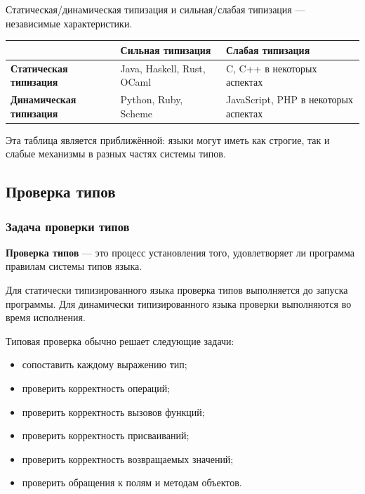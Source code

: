 \documentclass[12pt,a4paper]{article}
\begin{document}
Статическая/динамическая типизация и сильная/слабая типизация --- независимые
характеристики.

\begin{center}
\begin{tabular}{|p{}|p{}|p{}|}
\hline
 & \textbf{Сильная типизация} & \textbf{Слабая типизация} \\
\hline
\textbf{Статическая типизация} &
Java, Haskell, Rust, OCaml &
C, C++ в некоторых аспектах \\
\hline
\textbf{Динамическая типизация} &
Python, Ruby, Scheme &
JavaScript, PHP в некоторых аспектах \\
\hline
\end{tabular}
\end{center}

Эта таблица является приближённой: языки могут иметь как строгие, так и слабые
механизмы в разных частях системы типов.

\subsection{Проверка типов}

\subsubsection{Задача проверки типов}

\textbf{Проверка типов} --- это процесс установления того, удовлетворяет ли программа
правилам системы типов языка.

Для статически типизированного языка проверка типов выполняется до запуска программы.
Для динамически типизированного языка проверки выполняются во время исполнения.

Типовая проверка обычно решает следующие задачи:

\begin{itemize}
    \item сопоставить каждому выражению тип;
    \item проверить корректность операций;
    \item проверить корректность вызовов функций;
    \item проверить корректность присваиваний;
    \item проверить корректность возвращаемых значений;
    \item проверить обращения к полям и методам объектов.
\end{itemize}
\end{document}
